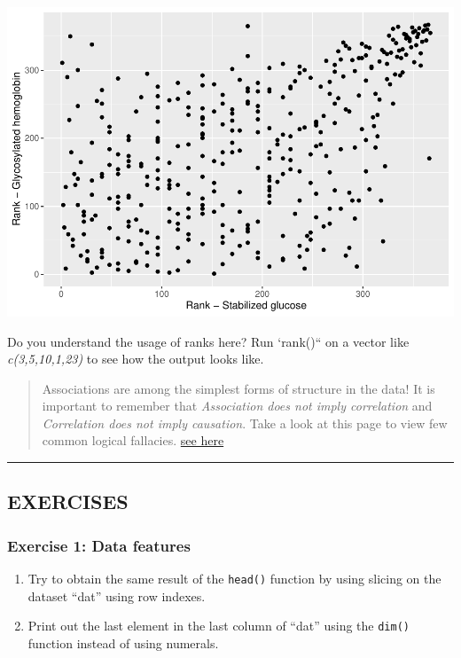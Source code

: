 \documentclass[
]{book}
\begin{document}
\includegraphics{_main_files/figure-latex/unnamed-chunk-57-1.pdf}

Do you understand the usage of ranks here? Run `rank()`` on a vector like \emph{c(3,5,10,1,23)} to see how the output looks like.

\begin{quote}
Associations are among the simplest forms of structure in the data! It is important to remember that \emph{Association does not imply correlation} and \emph{Correlation does not imply causation}. Take a look at this page to view few common logical fallacies. \href{https://en.wikipedia.org/wiki/Fallacy}{see here}
\end{quote}

\begin{center}\rule{0.5\linewidth}{0.5pt}\end{center}

\hypertarget{exercises}{%
\subsection{EXERCISES}\label{exercises}}

\hypertarget{exercise-1-data-features}{%
\subsubsection{Exercise 1: Data features}\label{exercise-1-data-features}}

\begin{enumerate}
\def\labelenumi{\arabic{enumi}.}
\item
  Try to obtain the same result of the \texttt{head()} function by using slicing on the dataset ``dat'' using row indexes.
\item
  Print out the last element in the last column of ``dat'' using the \texttt{dim()} function instead of using numerals.
\end{enumerate}
\end{document}
